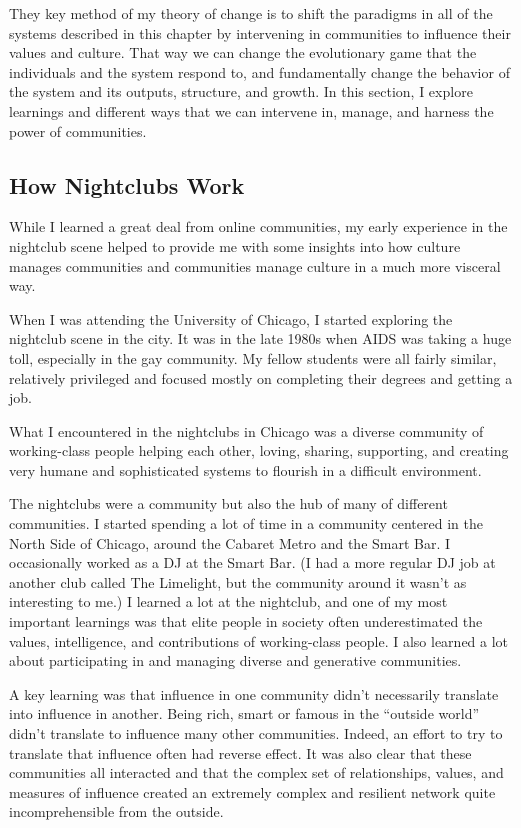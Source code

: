 They key method of my theory of change is to shift the paradigms in all of the systems described in this chapter by intervening in communities to influence their values and culture. That way we can change the evolutionary game that the individuals and the system respond to, and fundamentally change the behavior of the system and its outputs, structure, and growth. In this section, I explore learnings and different ways that we can intervene in, manage, and harness the power of communities.

\subsection{How Nightclubs Work}

While I learned a great deal from online communities, my early experience in the nightclub scene helped to provide me with some insights into how culture manages communities and communities manage culture in a much more visceral way.

When I was attending the University of Chicago, I started exploring the nightclub scene in the city. It was in the late 1980s when \ac{AIDS} was taking a huge toll, especially in the gay community. My fellow students were all fairly similar, relatively privileged and focused mostly on completing their degrees and getting a job.

What I encountered in the nightclubs in Chicago was a diverse community of working-class people helping each other, loving, sharing, supporting, and creating very humane and sophisticated systems to flourish in a difficult environment.

The nightclubs were a community but also the hub of many of different communities. I started spending a lot of time in a community centered in the North Side of Chicago, around the Cabaret Metro and the Smart Bar. I occasionally worked as a DJ at the Smart Bar. (I had a more regular DJ job at another club called The Limelight, but the community around it wasn't as interesting to me.) I learned a lot at the nightclub, and one of my most important learnings was that elite people in society often underestimated the values, intelligence, and contributions of working-class people. I also learned a lot about participating in and managing diverse and generative communities. 

A key learning was that influence in one community didn't necessarily translate into influence in another. Being rich, smart or famous in the ``outside world'' didn't translate to influence many other communities. Indeed, an effort to try to translate that influence often had reverse effect. It was also clear that these communities all interacted and that the complex set of relationships, values, and measures of influence created an extremely complex and resilient network quite incomprehensible from the outside.

